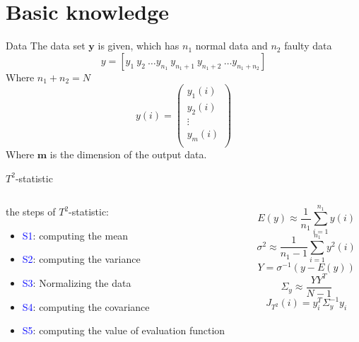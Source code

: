 \documentclass[10pt]{beamer}
\begin{document}
\section{Basic knowledge}
\begin{frame}{Data}
The data set $\textbf{y}$ is given, which has $n_1$ normal data and $n_2$
faulty data
\begin{equation}
   y = [y_1 \ y_2 \ \dots y_{n_1} \ y_{n_1+1} \ y_{n_1+2} \ \dots y_{n_1+n_2}] 
\end{equation}
Where $n_1 + n_2 = N$
\begin{equation}
    y(i) = 
    \begin{pmatrix}
        y_1(i) \\
        y_2(i) \\
       \vdots  \\
        y_m(i) \\ 
    \end{pmatrix}
\end{equation}
Where $\textbf{m}$ is the dimension of the output data. %
\end{frame}
\begin{frame}{$T^2$-statistic}
    \begin{columns}
        \begin{column}{0.5\textwidth}
            the steps of $T^2$-statistic:
      \begin{itemize}
      \item \textcolor{blue}{S1}: computing the mean
      \item \textcolor{blue}{S2}: computing the variance
      \item \textcolor{blue}{S3}: Normalizing the data
      \item \textcolor{blue}{S4}: computing the  covariance
      \item \textcolor{blue}{S5}: computing the value of evaluation function
 	 \end{itemize}  
        \end{column}
        \begin{column}{0.5\textwidth}  %
               \begin{equation}
               E(y) \approx \frac{1}{n_1}\sum_{i=1}^{n_1}y(i) 
               \end{equation}
                \begin{equation}
                   \sigma^2 \approx \frac{1}{n_1-1}\sum_{i=1}^{n_1}y^2(i) 
                \end{equation}
                \begin{equation}
                Y = \sigma^{-1}(y-E(y))
                \end{equation}
                \begin{equation}
                \Sigma_y \approx \frac{YY^T}{N-1}
                \end{equation}
                \begin{equation}
                       J_{T^2}(i) = y_i^T\Sigma_y^{-1}y_i
                \end{equation}
        \end{column}
    \end{columns}
\end{frame}
\end{document}
